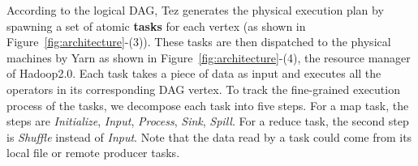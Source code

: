 


According to the logical DAG, Tez generates the physical execution plan by spawning a set of atomic \textbf{tasks} for each vertex (as shown in Figure~\ref{fig:architecture}-(3)). These tasks are then dispatched to the physical machines by Yarn as shown in Figure~\ref{fig:architecture}-(4), the resource manager of Hadoop2.0. Each task takes a piece of data as input and executes all the operators in its corresponding DAG vertex. To track the fine-grained execution process of the tasks, we decompose each task into five steps. For a map task, the steps are \textit{Initialize}, \textit{Input}, \textit{Process}, \textit{Sink}, \textit{Spill}. For a reduce task, the second step is \textit{Shuffle} instead of \textit{Input}. Note that the data read by a task could come from its local file or remote producer tasks.



